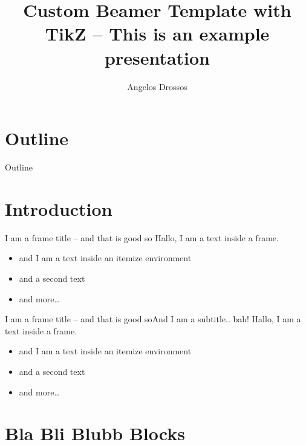 \documentclass[%
	english,  %
	]{beamer}
\title[Beamer Theme]{Custom Beamer Template with TikZ -- This is an example presentation}
\author[A.~Drossos]{Angelos Drossos}
\institute[TU]{Technische Universität}
\begin{document}
\frame[plain]{\titlepage}

\section*{Outline}
\begin{frame}{Outline}
	\tableofcontents[hideallsubsections]
\end{frame}


\section{Introduction}

\begin{frame}{\secname{}}
\end{frame}

\begin{frame}{I am a frame title -- and that is good so}
Hallo, I am a text inside a frame.

\vfill

\begin{itemize}
\item and I am a text inside an itemize environment
\item and a second text
\item and more\ldots
\end{itemize}
\end{frame}


\begin{frame}{I am a frame title -- and that is good so}{And I am a subtitle.. bah!}
Hallo, I am a text inside a frame.

\vfill

\begin{itemize}
\item and I am a text inside an itemize environment
\item and a second text
\item and more\ldots
\end{itemize}
\end{frame}


\section{Bla Bli Blubb Blocks}

\begin{frame}{\secname{}}
\end{frame}
\end{document}
